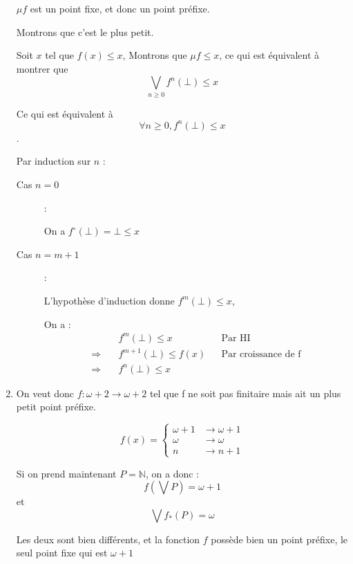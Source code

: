 \documentclass[12pt]{article}
\begin{document}
\begin{enumerate}
    $\mu f$ est un point fixe, et donc un point préfixe.

    Montrons que c'est le plus petit. 

    Soit $x$ tel que $f(x) \leq x$, Montrons que $\mu f \leq x$, ce qui est équivalent à montrer que $$\bigvee_{n\geq 0} f^n (\bot) \leq x$$

    Ce qui est équivalent à $$\forall n \geq 0, f^n(\bot) \leq x$$.

   Par induction sur $n$ : 
   \begin{description}
       \item [Cas $n=0$]: 

           On a $f^{\circ}(\bot) = \bot \leq x$
       \item[Cas $n= m+1$] : 

            L'hypothèse d'induction donne $f^m(\bot) \leq x$,

            On a : 
            \begin{align*}
                &f^m (\bot) \leq x && \text{Par HI}\\
                \Rightarrow \quad & f^{m+1} (\bot) \leq f(x) && \text{Par croissance de f}\\ 
                \Rightarrow \quad & f^n (\bot) \leq x
            \end{align*}

   \end{description}

\item On veut donc $f : \omega + 2 \rightarrow \omega + 2$ tel que f ne soit pas finitaire mais ait un plus petit point préfixe. 

\[
f(x) = 
\begin{cases} 
    \omega + 1 &\rightarrow \omega + 1 \\
    \omega &\rightarrow \omega \\ 
    n &\rightarrow n+1
\end{cases}
\]

Si on prend maintenant $P = \mathbb{N}$, on a donc :$$f(\bigvee P) = \omega + 1$$ et $$\bigvee f_* (P) = \omega$$ 

Les deux sont bien différents, et la fonction $f$ possède bien un point préfixe, le seul point fixe qui est $\omega + 1$
        




    

\end{enumerate}
\end{document}

